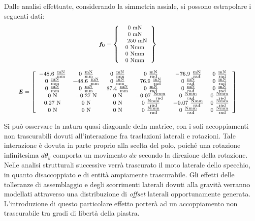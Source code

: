Dalle analisi effettuate, considerando la simmetria assiale, si possono estrapolare i seguenti dati:
\begin{equation}
\label{eq:6fc_xzalfa5}
\nonumber
\footnotesize
\begin{array}{c}
\boldsymbol{f_0} = 
\left\{\begin{array}{c}
0~\text{mN}\\
0~\text{mN}\\
-250~\text{mN}\\
0~\text{Nmm}\\
0~\text{Nmm}\\
0~\text{Nmm}
\end{array}\right\}
\\~\\
\boldsymbol{E} = 
\left[\begin{array}{cccccc}
-48.6~\frac{\text{mN}}{\text{mm}} &
0~\frac{\text{mN}}{\text{mm}} &
0~\frac{\text{mN}}{\text{mm}} &
0~\frac{\text{mN}}{\text{rad}} &
-76.9~\frac{\text{mN}}{\text{rad}} &
0~\frac{\text{mN}}{\text{rad}}\\

0~\frac{\text{mN}}{\text{mm}} &
-48.6~\frac{\text{mN}}{\text{mm}} &
0~\frac{\text{mN}}{\text{mm}} &
76.9~\frac{\text{mN}}{\text{rad}} &
0~\frac{\text{mN}}{\text{rad}} &
0~\frac{\text{mN}}{\text{rad}}\\


0~\frac{\text{mN}}{\text{mm}} &
0~\frac{\text{mN}}{\text{mm}} &
87.4~\frac{\text{mN}}{\text{mm}} &
0~\frac{\text{mN}}{\text{rad}} &
0~\frac{\text{mN}}{\text{rad}} &
0~\frac{\text{mN}}{\text{rad}}\\

0~\text{N} &
-0.27~\text{N} &
0~\text{N} &
-0.07~\frac{\text{Nmm}}{\text{rad}} &
0~\frac{\text{Nmm}}{\text{rad}} &
0~\frac{\text{Nmm}}{\text{rad}}\\

0.27~\text{N} &
0~\text{N} &
0~\text{N} &
0~\frac{\text{Nmm}}{\text{rad}} &
-0.07~\frac{\text{Nmm}}{\text{rad}} &
0~\frac{\text{Nmm}}{\text{rad}}\\

0~\text{N} &
0~\text{N} &
0~\text{N} &
0~\frac{\text{Nmm}}{\text{rad}} &
0~\frac{\text{Nmm}}{\text{rad}} &
0~\frac{\text{Nmm}}{\text{rad}}
\end{array}\right]

\end{array}
\end{equation}

Si può osservare la natura quasi diagonale della matrice, con i soli accoppiamenti non trascurabili dovuti all'interazione fra traslazioni laterali e rotazioni. Tale interazione è dovuta in parte proprio alla scelta del polo, poiché una rotazione infinitesima $d\theta_y$ comporta un movimento $dx$ secondo la direzione della rotazione. Nelle analisi strutturali successive verrà trascurato il moto laterale dello specchio, in quanto disaccoppiato e di entità ampiamente trascurabile. Gli effetti delle tolleranze di assemblaggio e degli scorrimenti laterali dovuti alla gravità verranno modellati attraverso una distribuzione di \textit{offset} laterali opportunamente generata. L'introduzione di questo particolare effetto porterà ad un accoppiamento non trascurabile tra gradi di libertà della piastra.

